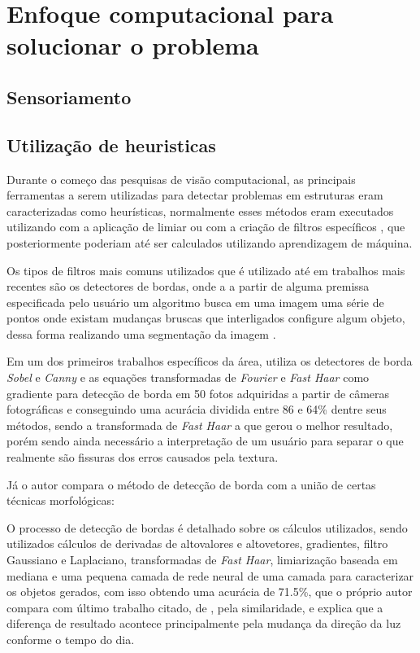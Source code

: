 \section{Enfoque computacional para solucionar o problema}

\subsection{Sensoriamento}


\subsection{Utilização de heuristicas}

Durante o começo das pesquisas de visão computacional, as principais ferramentas a serem utilizadas para detectar problemas em estruturas eram caracterizadas como heurísticas, normalmente esses métodos eram executados utilizando com a aplicação de limiar ou com a criação de filtros específicos \cite{spencer2019advances}, que posteriormente poderiam até ser calculados utilizando aprendizagem de máquina.

Os tipos de filtros mais comuns utilizados que é utilizado até em trabalhos mais recentes são os detectores de bordas, onde a a partir de alguma premissa especificada pelo usuário um algoritmo busca em uma imagem uma série de pontos onde existam mudanças bruscas que interligados configure algum objeto, dessa forma realizando uma segmentação da imagem \cite{ziou1998edge}.

Em um dos primeiros trabalhos específicos da área,  utiliza os detectores de borda \textit{Sobel} e \textit{Canny} e as equações transformadas de \textit{Fourier} e \textit{Fast Haar} como gradiente para detecção de borda em 50 fotos adquiridas a partir de câmeras fotográficas e conseguindo uma acurácia dividida entre 86 e 64\% dentre seus métodos, sendo a transformada de \textit{Fast Haar} a que gerou o melhor resultado, porém sendo ainda necessário a interpretação de um usuário para separar o que realmente são fissuras dos erros causados pela textura. 

Já o autor  compara o método de detecção de borda com a união de certas técnicas morfológicas:

O processo de detecção de bordas é detalhado sobre os cálculos utilizados, sendo utilizados cálculos de derivadas de altovalores e altovetores, gradientes, filtro Gaussiano e Laplaciano, transformadas de \textit{Fast Haar}, limiarização baseada em mediana e uma pequena camada de rede neural de uma camada para caracterizar os objetos gerados, com isso obtendo uma acurácia de 71.5\%, que o próprio autor compara com último trabalho citado, de \cite{abdel2003analysis}, pela similaridade, e explica que a diferença de resultado acontece principalmente pela mudança da direção da luz conforme o tempo do dia. 

